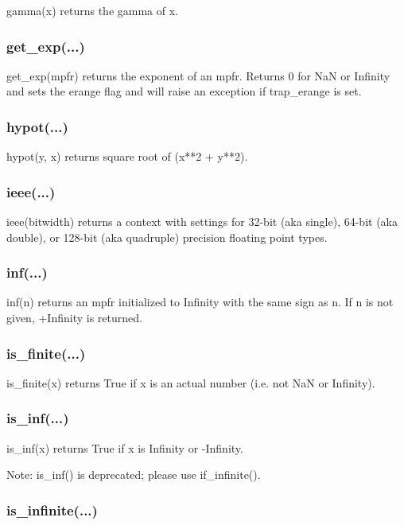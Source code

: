 gamma(x) returns the gamma of x.

\subsubsection{get\_exp(...)}

get\_exp(mpfr) returns the exponent of an mpfr. Returns 0 for NaN or Infinity and sets the
erange flag and will raise an exception if trap\_erange is set.

\subsubsection{hypot(...)}

hypot(y, x) returns square root of (x**2 + y**2).

\subsubsection{ieee(...)}

ieee(bitwidth) returns a context with settings for 32-bit (aka single), 64-bit (aka double), or
128-bit (aka quadruple) precision floating point types.

\subsubsection{inf(...)}

inf(n) returns an mpfr initialized to Infinity with the same sign as n. If n is not given, +Infinity is returned.

\subsubsection{is\_finite(...)}

is\_finite(x) returns True if x is an actual number (i.e. not NaN or Infinity).

\subsubsection{is\_inf(...)}

is\_inf(x) returns True if x is Infinity or -Infinity.

Note: is\_inf() is deprecated; please use if\_infinite().


\subsubsection{is\_infinite(...)}


